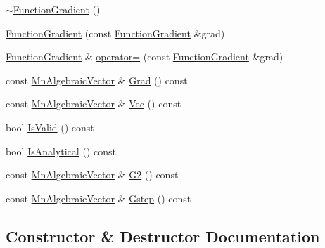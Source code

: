 \begin{DoxyCompactItemize}
\item 
\mbox{\hyperlink{classROOT_1_1Minuit2_1_1FunctionGradient_a702df78fcfb1f33625273cb1c9cb1914}{$\sim$\+Function\+Gradient}} ()
\item 
\mbox{\hyperlink{classROOT_1_1Minuit2_1_1FunctionGradient_ad21f4d36683bacc95bf2dfe74fe4d205}{Function\+Gradient}} (const \mbox{\hyperlink{classROOT_1_1Minuit2_1_1FunctionGradient}{Function\+Gradient}} \&grad)
\item 
\mbox{\hyperlink{classROOT_1_1Minuit2_1_1FunctionGradient}{Function\+Gradient}} \& \mbox{\hyperlink{classROOT_1_1Minuit2_1_1FunctionGradient_a0b85ff1f65dbefea4c3953898efb06ec}{operator=}} (const \mbox{\hyperlink{classROOT_1_1Minuit2_1_1FunctionGradient}{Function\+Gradient}} \&grad)
\item 
const \mbox{\hyperlink{namespaceROOT_1_1Minuit2_a62ed97730a1ca8d3fbaec64a19aa11c9}{Mn\+Algebraic\+Vector}} \& \mbox{\hyperlink{classROOT_1_1Minuit2_1_1FunctionGradient_a0effb8dbe0115928f72f122621ba4ad3}{Grad}} () const
\item 
const \mbox{\hyperlink{namespaceROOT_1_1Minuit2_a62ed97730a1ca8d3fbaec64a19aa11c9}{Mn\+Algebraic\+Vector}} \& \mbox{\hyperlink{classROOT_1_1Minuit2_1_1FunctionGradient_abdf0fd7d9e1a730049112f0c903a9f5f}{Vec}} () const
\item 
bool \mbox{\hyperlink{classROOT_1_1Minuit2_1_1FunctionGradient_a441801769f9021ade74b724584731791}{Is\+Valid}} () const
\item 
bool \mbox{\hyperlink{classROOT_1_1Minuit2_1_1FunctionGradient_a34dd6c6a7d699a149edfbb3328c525db}{Is\+Analytical}} () const
\item 
const \mbox{\hyperlink{namespaceROOT_1_1Minuit2_a62ed97730a1ca8d3fbaec64a19aa11c9}{Mn\+Algebraic\+Vector}} \& \mbox{\hyperlink{classROOT_1_1Minuit2_1_1FunctionGradient_a6f99988a7fd1a61ed96c6709f02b6041}{G2}} () const
\item 
const \mbox{\hyperlink{namespaceROOT_1_1Minuit2_a62ed97730a1ca8d3fbaec64a19aa11c9}{Mn\+Algebraic\+Vector}} \& \mbox{\hyperlink{classROOT_1_1Minuit2_1_1FunctionGradient_a09cf6f34997cef2cffca0d9ccc2b36b8}{Gstep}} () const
\end{DoxyCompactItemize}


\subsection{Constructor \& Destructor Documentation}
\mbox{\label{classROOT_1_1Minuit2_1_1FunctionGradient_ae2e6c3f8011dbe5aaf75c8e41b7de9b5}} 
